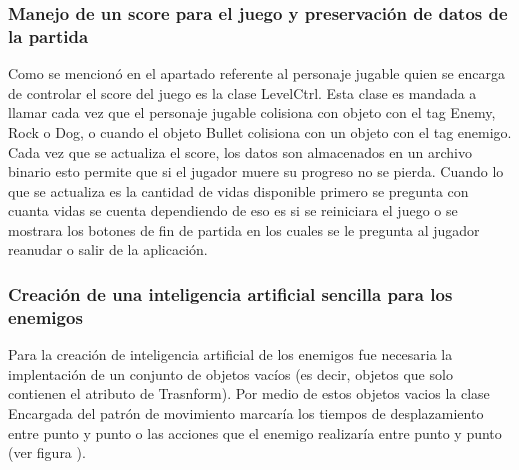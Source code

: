  \subsubsection{Manejo de un score para el juego y preservación de datos de la partida}
 Como se mencionó en el apartado referente al personaje jugable quien se encarga 
 de controlar el score del juego es la clase LevelCtrl. Esta clase es mandada a 
 llamar cada vez que el personaje jugable colisiona con objeto con el tag Enemy, 
 Rock o Dog, o cuando el objeto Bullet colisiona con un objeto con el tag enemigo. 
 Cada vez que se actualiza el score, los datos son almacenados en un archivo 
 binario esto permite que si el jugador muere su progreso no se pierda. Cuando 
 lo que se actualiza es la cantidad de vidas disponible primero se pregunta con 
 cuanta vidas se cuenta  dependiendo de eso es si se reiniciara el juego o se mostrara 
 los botones de fin de partida en los cuales se le pregunta al jugador reanudar o 
 salir de la aplicación.   
 
 \subsubsection{Creación de una inteligencia artificial sencilla para los enemigos}
 Para la creación de inteligencia artificial de los enemigos fue necesaria 
 la implentación de un conjunto de objetos vacíos (es decir, objetos que solo 
 contienen el atributo de Trasnform). Por medio de estos objetos vacios la clase 
 Encargada del patrón de movimiento marcaría los tiempos de desplazamiento entre 
 punto y punto o las acciones que el enemigo realizaría entre punto y punto (ver figura ).  
